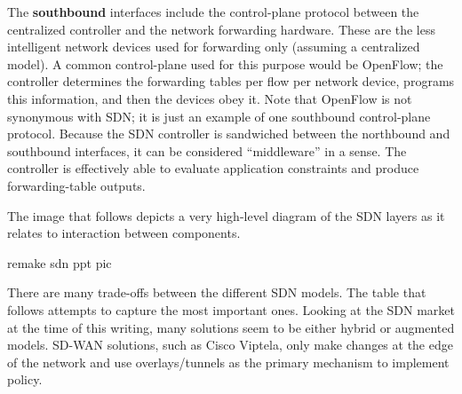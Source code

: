 The \textbf{southbound} interfaces include the control-plane protocol between the
centralized controller and the network forwarding hardware. These are the less
intelligent network devices used for forwarding only (assuming a centralized
model). A common control-plane used for this purpose would be OpenFlow; the
controller determines the forwarding tables per flow per network device,
programs this information, and then the devices obey it. Note that OpenFlow is
not synonymous with SDN\@; it is just an example of one southbound control-plane
protocol. Because the SDN controller is sandwiched between the northbound and
southbound interfaces, it can be considered ``middleware'' in a sense. The
controller is effectively able to evaluate application constraints and produce
forwarding-table outputs.

The image that follows depicts a very high-level diagram of the SDN layers as
it relates to interaction between components.

remake sdn ppt pic

There are many trade-offs between the different SDN models. The table that follows
attempts to capture the most important ones. Looking at the SDN market at the
time of this writing, many solutions seem to be either hybrid or augmented
models. SD-WAN solutions, such as Cisco Viptela, only make changes at the edge
of the network and use overlays/tunnels as the primary mechanism to implement policy.

